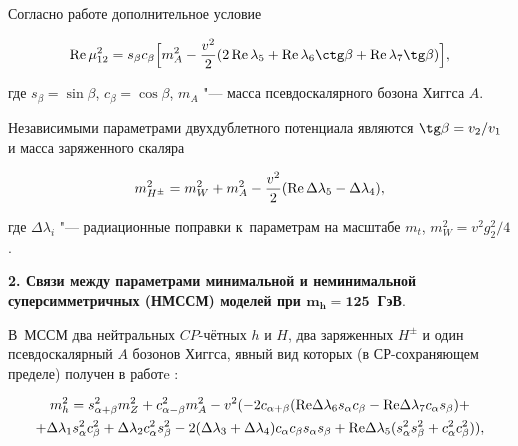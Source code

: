 Согласно работе \cite{ech} дополнительное условие

\begin{equation}

\mathop{\rm Re}\mu_{12}^2=s_\beta c_\beta\Bigl [m_A^2-\frac{v^2}{2}(2\mathop{\rm Re}\lambda_5 +\mathop{\rm Re}\lambda_6 \ctg\beta +\mathop{\rm Re}\lambda_7 \tg \beta)\Bigr],

\end{equation}

где $s_\beta=\sin \beta$, $c_\beta=\cos \beta$, $m_A$ "--- масса псевдоскалярного бозона Хиггса $A$.



Независимыми параметрами двухдублетного потенциала являются $\tg \beta=v_2/v_1$ и масса заряженного скаляра

\begin{equation}

m_{H^\pm}^2=m_W^2+m_A^2-\frac{v^2}{2}(\mathop{\rm Re} \Delta \lambda_5-\Delta \lambda_4),

\end{equation}

где $\Delta \lambda_i$ "--- радиационные поправки к~параметрам на масштабе $m_{t}$, $m_W^2=v^2g_2^2/4$.





\smallskip




\textbf{2. Связи между параметрами минимальной и неминимальной суперсимметричных (НМССМ) моделей  при $\boldsymbol{m_h=125}$~ГэВ}. 

В~МССМ два нейтральных $CP$-чётных $h$ и $H$, два заряженных $H^\pm$ и один псевдоскалярный $A$ бозонов Хиггса, явный вид которых (в СР-сохраняющем пределе) получен в работe \cite{ech}:

\begin{multline}

m^2_h = s^2_{\alpha+\beta} m^2_Z + c^2_{\alpha-\beta} m^2_A - v^2 (-2 c_{\alpha+\beta} ({\mathop{\rm Re}}\Delta \lambda_6 s_{\alpha} c_{\beta} -{\mathop{\rm Re}}\Delta \lambda_7 c_{\alpha} s_{\beta})+\\

 + \Delta  \lambda_1 s^2_{\alpha} c^2_{\beta} +\Delta  \lambda_2 c^2_{\alpha} s^2_{\beta}- 2(\Delta  \lambda_3+\Delta  \lambda_4)c_{\alpha} c_{\beta} s_{\alpha} s_{\beta}+ {\mathop{\rm Re}}\Delta \lambda_5 (s^2_{\alpha} s^2_{\beta} +c^2_{\alpha} c^2_{\beta})),\label{eq:lighth}

\end{multline} 

